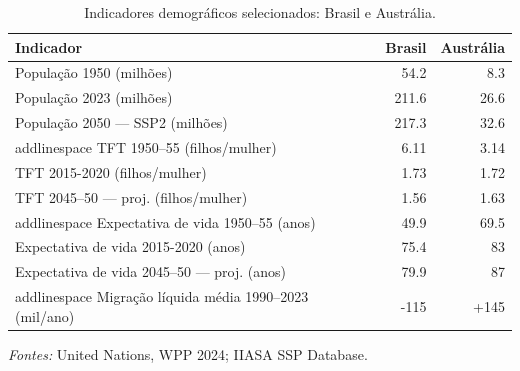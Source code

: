 \begin{table}[H]
\label{tab:indicadores}

\caption{Indicadores demográficos selecionados: Brasil e Austrália.}
\centering
\begin{tabular}[t]{lrr}
\toprule
Indicador & Brasil & Austr\'{a}lia\\
\midrule
População 1950 (milhões) & 54.2 & 8.3\\
População 2023 (milhões) & 211.6 & 26.6\\
População 2050 --- SSP2 (milhões) & 217.3 & 32.6\\
addlinespace
TFT 1950--55 (filhos/mulher) & 6.11 & 3.14\\
TFT 2015-2020 (filhos/mulher) & 1.73 & 1.72\\
\addlinespace
TFT 2045--50 --- proj. (filhos/mulher) & 1.56 & 1.63\\
addlinespace
Expectativa de vida 1950--55 (anos) & 49.9 & 69.5\\
Expectativa de vida 2015-2020 (anos) & 75.4 & 83\\
Expectativa de vida 2045--50 --- proj. (anos) & 79.9 & 87\\
addlinespace
Migra\c{c}\~ao l\'{i}quida m\'{e}dia 1990--2023 (mil/ano) & -115 & +145\\
\bottomrule
\end{tabular}
\footnotesize{\textit{Fontes:} United Nations, WPP 2024; IIASA SSP Database.}
\end{table}
